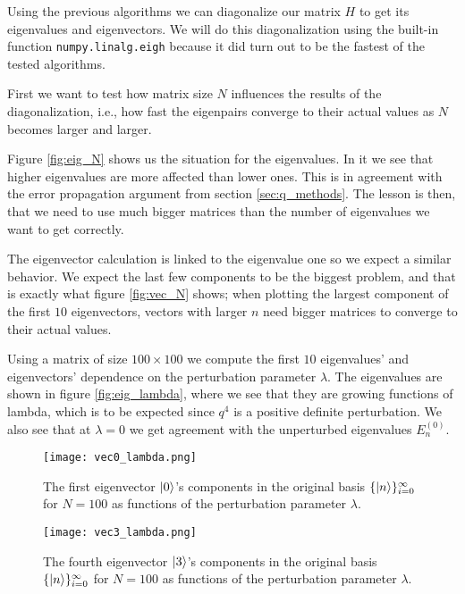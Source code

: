 \documentclass[10pt,a4paper,twocolumn]{article}
\begin{document}
Using the previous algorithms we can diagonalize our matrix $H$ to get its eigenvalues and eigenvectors. We will do this diagonalization using the built-in function \texttt{numpy.linalg.eigh} because it did turn out to be the fastest of the tested algorithms.

First we want to test how matrix size $N$ influences the results of the diagonalization, i.e., how fast the eigenpairs converge to their actual values as $N$ becomes larger and larger.

Figure \ref{fig:eig_N} shows us the situation for the eigenvalues. In it we see that higher eigenvalues are more affected than lower ones. This is in agreement with the error propagation argument from section \ref{sec:q_methods}. The lesson is then, that we need to use much bigger matrices than the number of eigenvalues we want to get correctly.

The eigenvector calculation is linked to the eigenvalue one so we expect a similar behavior. We expect the last few components to be the biggest problem, and that is exactly what figure \ref{fig:vec_N} shows; when plotting the largest component of the first $10$ eigenvectors, vectors with larger $n$ need bigger matrices to converge to their actual values.

Using a matrix of size $100 \times 100$ we compute the first $10$ eigenvalues' and eigenvectors' dependence on the perturbation parameter $\lambda$. The eigenvalues are shown in figure \ref{fig:eig_lambda}, where we see that they are growing functions of lambda, which is to be expected since $q^4$ is a positive definite perturbation. We also see that at $\lambda=0$ we get agreement with the unperturbed eigenvalues $E_n^{(0)}$.

\begin{figure}
\centering
\captionsetup{justification=centering}\texttt{[image: vec0\_lambda.png]}
\caption{The first eigenvector $\ket{0}$'s components in the original basis $\{\ket{n}\}_{i=0}^{\infty}$ for $N=100$ as functions of the perturbation parameter $\lambda$.}
\label{fig:vec0_lambda}
\end{figure}

\begin{figure}
\centering
\captionsetup{justification=centering}
\texttt{[image: vec3\_lambda.png]}
\caption{The fourth eigenvector $\ket{3}$'s components in the original basis $\{\ket{n}\}_{i=0}^{\infty}$ for $N=100$ as functions of the perturbation parameter $\lambda$.}
\label{fig:vec3_lambda}
\end{figure}
\end{document}
